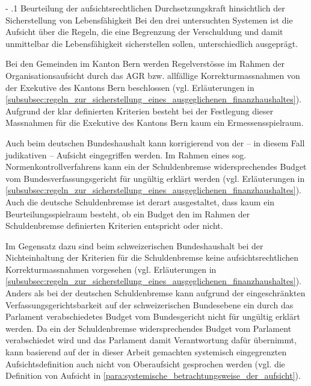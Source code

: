 \documentclass[10pt]{article}
\makeatletter
\renewcommand\paragraph{\@startsection{paragraph}{3}{0mm}{-\baselineskip}{.1\baselineskip}{\normalfont\normalsize\bfseries}}
\renewcommand\paragraph{%
\@startsection{paragraph}{3}{0mm}%
{-\baselineskip}%
{.1\baselineskip}%
{\normalfont\normalsize\bfseries}}
\makeatother
\begin{document}
\paragraph{Beurteilung der aufsichtsrechtlichen Durchsetzungskraft hinsichtlich der Sicherstellung von Lebensfähigkeit}\label{para:beurteilung_der_aufsichtsrechtlichen_durchsetzungskraft_hinsichtlich_der_sicherstellung_von_lebensfaehigkeit}
Bei den drei untersuchten Systemen ist die Aufsicht über die Regeln, die eine Begrenzung der Verschuldung und damit unmittelbar die Lebensfähigkeit sicherstellen sollen, unterschiedlich ausgeprägt.

Bei den Gemeinden im Kanton Bern werden Regelverstösse im Rahmen der Organisationsaufsicht durch das AGR bzw. allfällige Korrekturmassnahmen von der Exekutive des Kantons Bern beschlossen (vgl. Erläuterungen in \vref{subsubsec:regeln_zur_sicherstellung_eines_ausgeglichenen_finanzhaushaltes}). Aufgrund der klar definierten Kriterien besteht bei der Festlegung dieser Massnahmen für die Exekutive des Kantons Bern kaum ein Ermessensspielraum. 

Auch beim deutschen Bundeshaushalt kann korrigierend von der -- in diesem Fall judikativen -- Aufsicht eingegriffen werden. Im Rahmen eines sog. Normenkontroll­ver­fahrens kann ein der Schuldenbremse widersprechendes Budget vom Bundesver­fassungsgericht für ungültig erklärt werden (vgl. Erläuterungen in \vref{subsubsec:regeln_zur_sicherstellung_eines_ausgeglichenen_finanzhaushaltes}). Auch die deutsche Schuldenbremse ist derart ausgestaltet, dass kaum ein Beurteilungsspielraum besteht, ob ein Budget den im Rahmen der Schuldenbremse definierten Kriterien entspricht oder nicht.

Im Gegensatz dazu sind beim schweizerischen Bundeshaushalt bei der Nichteinhaltung der Kriterien für die Schuldenbremse keine aufsichtsrechtlichen Korrekturmassnahmen vorgesehen (vgl. Erläuterungen in \vref{subsubsec:regeln_zur_sicherstellung_eines_ausgeglichenen_finanzhaushaltes}). Anders als bei der deutschen Schuldenbremse kann aufgrund der eingeschränkten Verfassungs­gerichts­barkeit auf der schweizerischen Bundesebene ein durch das Parlament verabschiedetes Budget vom Bundesgericht nicht für ungültig erklärt werden. Da ein der Schuldenbremse widersprechendes Budget vom Parlament verabschiedet wird und das Parlament damit Verantwortung dafür übernimmt, kann basierend auf der in dieser Arbeit gemachten systemisch eingegrenzten Aufsichtsdefinition auch nicht von Oberaufsicht gesprochen werden (vgl. die Definition von Aufsicht in \vref{para:systemische_betrachtungsweise_der_aufsicht}). 
\end{document}
